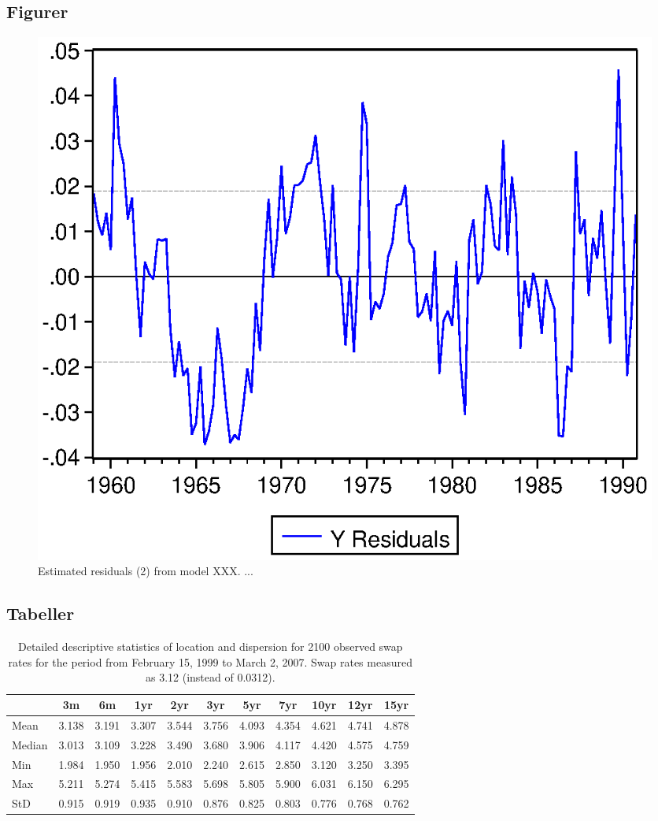\documentclass[a4paper,11pt]{article}
\begin{document}
\hypertarget{figurer}{%
\subsection{Figurer}\label{figurer}}
\begin{figure}

{\centering \includegraphics[width=0.5\linewidth,]{figures/graph} 

}

\caption{Estimated residuals (2) from model XXX. ...}\label{fig:graph2}
\end{figure}
\hypertarget{tabeller}{%
\subsection{Tabeller}\label{tabeller}}
\begin{table}[ht]
    \begin{center}
        {\footnotesize
        \begin{tabular}{l|cccccccccc}
        \hline \hline
                        & 3m    & 6m    & 1yr   & 2yr   & 3yr   & 5yr   & 7yr   & 10yr  & 12yr  & 15yr   \\
            \hline
                Mean   & 3.138 & 3.191 & 3.307 & 3.544 & 3.756 & 4.093 & 4.354 & 4.621 & 4.741 & 4.878  \\
                Median & 3.013 & 3.109 & 3.228 & 3.490 & 3.680 & 3.906 & 4.117 & 4.420 & 4.575 & 4.759  \\
                Min    & 1.984 & 1.950 & 1.956 & 2.010 & 2.240 & 2.615 & 2.850 & 3.120 & 3.250 & 3.395  \\
                Max    & 5.211 & 5.274 & 5.415 & 5.583 & 5.698 & 5.805 & 5.900 & 6.031 & 6.150 & 6.295  \\
                StD    & 0.915 & 0.919 & 0.935 & 0.910 & 0.876 & 0.825 & 0.803 & 0.776 & 0.768 & 0.762  \\
            \hline \hline
        \end{tabular}}
    \end{center}
    \caption{Detailed descriptive statistics of location and dispersion for
    2100 observed swap rates for the period from
    February 15, 1999 to March 2, 2007. Swap rates measured as 3.12 (instead of 0.0312).}
    \label{tab:apptable}
\end{table}
\newpage

\end{document}

